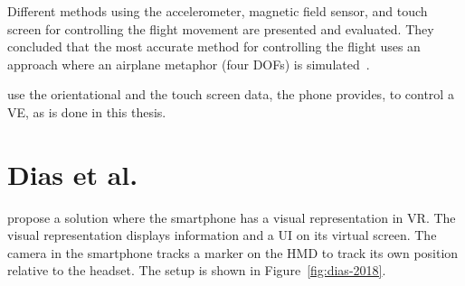 Different methods using the accelerometer, magnetic field sensor, and touch screen for controlling the flight movement are presented and evaluated. They concluded that the most accurate method for controlling the flight uses an approach where an airplane metaphor (four \glspl{DOF}) is simulated~\cite{Benzina.2011}.

\citeauthor{Benzina.2011} use the orientational and the touch screen data, the phone provides, to control a \gls{VE}, as is done in this thesis.


\section{Dias et al.}\label{section:dias-2018}
\citeauthor{Dias.2018} propose a solution where the smartphone has a visual representation in \gls{VR}. The visual representation displays information and a \gls{UI} on its virtual screen. The camera in the smartphone tracks a marker on the \gls{HMD} to track its own position relative to the headset. The setup is shown in Figure~\ref{fig:dias-2018}.


